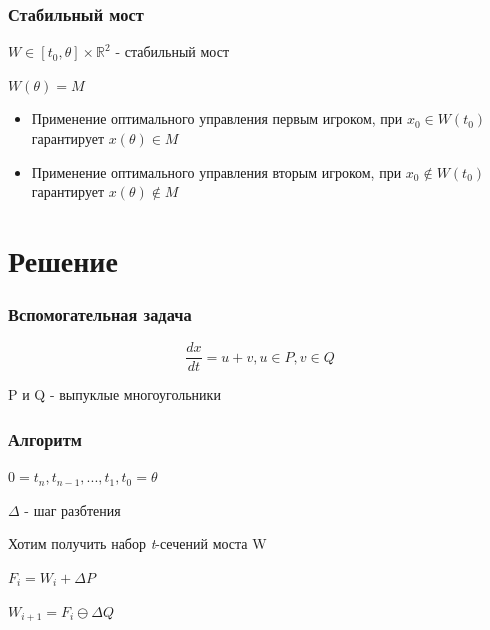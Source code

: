 \documentclass{beamer}
\newcommand{\dimension}{\mathbb{R}^2}
\begin{document}
  
  \begin{frame}
    \frametitle{Стабильный мост}

    $W \in [t_0, \theta] \times \dimension$ - стабильный мост

    $W(\theta)=M$

    \begin{itemize}
      \item Применение оптимального управления первым игроком,
      при $x_0 \in W(t_0)$ гарантирует $x(\theta) \in M$
      \item Применение оптимального управления вторым игроком,
      при $x_0 \notin W(t_0)$ гарантирует $x(\theta) \notin M$
    \end{itemize}

  \end{frame}
  
  
  \section{Решение}
  
  
  \begin{frame}
    \frametitle{Вспомогательная задача}

    \begin{equation}
      \frac{dx}{dt} = u + v, u \in P, v \in Q
    \end{equation}

    P и Q - выпуклые многоугольники

  \end{frame}
  
  
  \begin{frame}
    \frametitle{Алгоритм}

    $0=t_n, t_{n-1}, ..., t_1, t_0=\theta$

    $\Delta$ - шаг разбтения 

    Хотим получить набор \textit{t}-сечений моста W

    $F_i = W_i + \Delta P$
    
    $W_{i+1} = F_i \ominus \Delta  Q$

  \end{frame}
  
\end{document}
